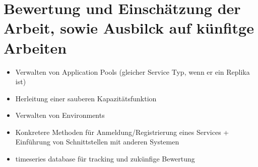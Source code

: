 \documentclass[
	12pt,
	BCOR=5mm,
	DIV=12,
	headinclude=on,
	footinclude=off,
	parskip=half,
	bibliography=totoc,
	listof=entryprefix,
	toc=listof,
	numbers=noenddot,
	plainfootsepline
]{scrreprt}
\begin{document}


\chapter{Bewertung und Einschätzung der Arbeit, sowie Ausbilck auf künfitge Arbeiten}

\begin{itemize}
	\item Verwalten von Application Pools (gleicher Service Typ, wenn er ein Replika ist)
	\item Herleitung einer sauberen Kapazitätsfunktion
	\item Verwalten von Environments
	\item Konkretere Methoden für Anmeldung/Registrierung eines Services + Einführung von Schnittstellen mit anderen Systemen
	\item timeseries database für tracking und zukünfige Bewertung
\end{itemize}
\clearpage
\ihead{}
\printbibliography[title=Literaturverzeichnis]
\cleardoublepage

\end{document}
